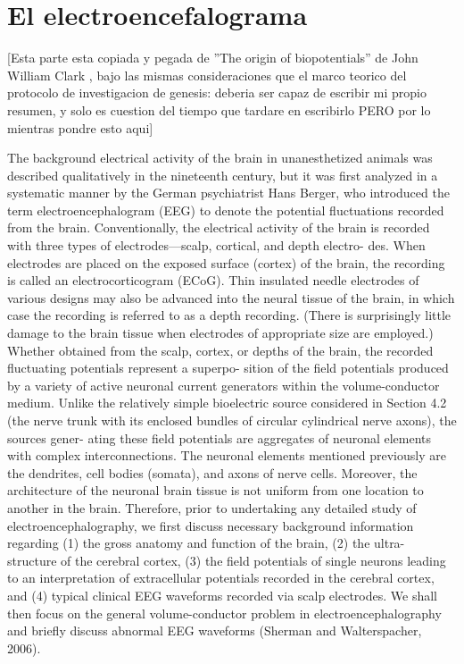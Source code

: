 

\section{El electroencefalograma}

[Esta parte esta copiada y pegada de ''The origin of biopotentials'' de John William Clark \cite{clark98},
bajo las mismas consideraciones que el marco teorico del protocolo de investigacion de genesis:
deberia ser capaz de escribir mi propio resumen, y solo es cuestion del tiempo que tardare en escribirlo
PERO por lo mientras pondre esto aqui]

The background electrical activity of the brain in unanesthetized animals was
described qualitatively in the nineteenth century, but it was first analyzed in a
systematic manner by the German psychiatrist Hans Berger, who introduced
the term electroencephalogram (EEG) to denote the potential fluctuations
recorded from the brain. Conventionally, the electrical activity of the brain is
recorded with three types of electrodes—scalp, cortical, and depth electro-
des. When electrodes are placed on the exposed surface (cortex) of the brain,
the recording is called an electrocorticogram (ECoG). Thin insulated needle
electrodes of various designs may also be advanced into the neural tissue of
the brain, in which case the recording is referred to as a depth recording.
(There is surprisingly little damage to the brain tissue when electrodes of
appropriate size are employed.) Whether obtained from the scalp, cortex, or
depths of the brain, the recorded fluctuating potentials represent a superpo-
sition of the field potentials produced by a variety of active neuronal current
generators within the volume-conductor medium. Unlike the relatively
simple bioelectric source considered in Section 4.2 (the nerve trunk with
its enclosed bundles of circular cylindrical nerve axons), the sources gener-
ating these field potentials are aggregates of neuronal elements with complex
interconnections. The neuronal elements mentioned previously are the
dendrites, cell bodies (somata), and axons of nerve cells. Moreover, the
architecture of the neuronal brain tissue is not uniform from one location to
another in the brain. Therefore, prior to undertaking any detailed study of
electroencephalography, we first discuss necessary background information
regarding (1) the gross anatomy and function of the brain, (2) the ultra-
structure of the cerebral cortex, (3) the field potentials of single neurons
leading to an interpretation of extracellular potentials recorded in the
cerebral cortex, and (4) typical clinical EEG waveforms recorded via scalp
electrodes. We shall then focus on the general volume-conductor problem in
electroencephalography and briefly discuss abnormal EEG waveforms
(Sherman and Walterspacher, 2006).

